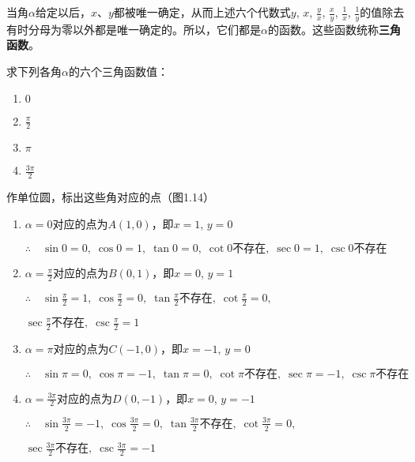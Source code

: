 \begin{note}
当角$\alpha$给定以后，$x$、$y$都被唯一确定，从而上述六个代数式$y$, $x$, $\frac{y}{x}$, $\frac{x}{y}$, $\frac{1}{x}$, $\frac{1}{y}$的值除去有时分母为零以外都是唯一确定的。所以，它们都是$\alpha$的函数。这些函数统称\textbf{三角函数}。
\end{note}

\begin{example}
    求下列各角$\alpha$的六个三角函数值：
\begin{multicols}{4}
\begin{enumerate}[(1)]
    \item $0$
    \item $\frac{\pi}{2}$
    \item $\pi$
    \item $\frac{3\pi}{2}$
\end{enumerate}
\end{multicols}
\end{example}

\begin{solution}
作单位圆，标出这些角对应的点（图1.14）
\begin{figure}[htp]
    \centering
{}
    \caption{}
\end{figure}
\begin{enumerate}[(1)]
    \item $\alpha=0$对应的点为$A(1,0)$，即$x=1$, $y=0$
    
$\therefore\quad \sin 0=0, \; \cos 0=1,\; \tan 0=0,\; \cot0\text{不存在},\; \sec0=1,\; \csc0\text{不存在}$

\item $\alpha=\frac{\pi}{2}$对应的点为$B(0,1)$，即$x=0$, $y=1$
    
$\therefore\quad \sin \frac{\pi}{2}=1, \; \cos \frac{\pi}{2}=0,\; \tan \frac{\pi}{2}\text{不存在},\; \cot\frac{\pi}{2}=0,$

$\sec\frac{\pi}{2}\text{不存在},\; \csc\frac{\pi}{2}=1$

\item $\alpha=\pi$对应的点为$C(-1,0)$，即$x=-1$, $y=0$
    
$\therefore\quad \sin \pi=0, \; \cos \pi=-1,\; \tan \pi=0,\; \cot\pi\text{不存在},\; \sec\pi=-1,\; \csc\pi\text{不存在}$

\item $\alpha=\frac{3\pi}{2}$对应的点为$D(0,-1)$，即$x=0$, $y=-1$
    
$\therefore\quad \sin \frac{3\pi}{2}=-1, \; \cos \frac{3\pi}{2}=0,\; \tan \frac{3\pi}{2}\text{不存在},\; \cot\frac{3\pi}{2}=0,$

$\sec\frac{3\pi}{2}\text{不存在},\; \csc\frac{3\pi}{2}=-1$
\end{enumerate}
\end{solution}


